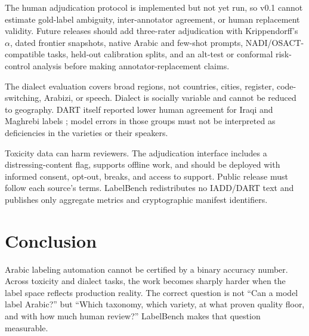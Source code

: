 \documentclass[10pt,twocolumn]{article}
\begin{document}
The human adjudication protocol is implemented but not yet run, so v0.1 cannot
estimate gold-label ambiguity, inter-annotator agreement, or human replacement
validity. Future releases should add three-rater adjudication with
Krippendorff's $\alpha$, dated frontier snapshots, native Arabic and few-shot
prompts, NADI/OSACT-compatible tasks, held-out calibration splits, and an
alt-test or conformal risk-control analysis before making annotator-replacement
claims.

The dialect evaluation covers broad regions, not countries, cities, register,
code-switching, Arabizi, or speech. Dialect is socially variable and cannot be
reduced to geography. DART itself reported lower human agreement for Iraqi and
Maghrebi labels \citep{dart2018}; model errors in those groups must not be
interpreted as deficiencies in the varieties or their speakers.

Toxicity data can harm reviewers. The adjudication interface includes a
distressing-content flag, supports offline work, and should be deployed with
informed consent, opt-out, breaks, and access to support. Public release must
follow each source's terms. LabelBench redistributes no IADD/DART text and
publishes only aggregate metrics and cryptographic manifest identifiers.

\section{Conclusion}
Arabic labeling automation cannot be certified by a binary accuracy number.
Across toxicity and dialect tasks, the work becomes sharply harder when the
label space reflects production reality. The correct question is not ``Can a
model label Arabic?'' but ``Which taxonomy, which variety, at what proven
quality floor, and with how much human review?'' LabelBench makes that question
measurable.



\end{document}
